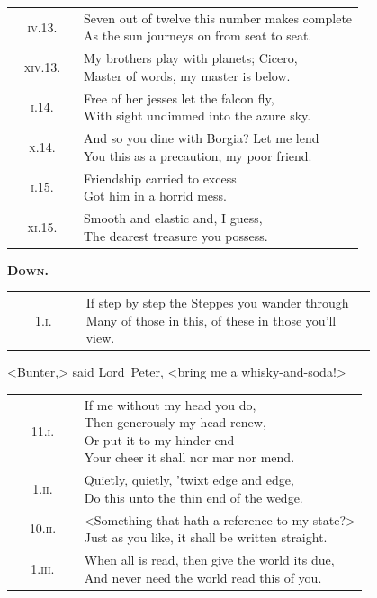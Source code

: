 \begin{longtable} {c p{0.8\linewidth}} 
\textsc{iv}.13. &  \makecell[l]{Seven out of twelve this number makes complete\\
As the sun journeys on from seat to seat.}\\
\textsc{xiv}.13. &  \makecell[l]{My brothers play with planets; Cicero,\\
Master of words, my master is below.}\\
\textsc{i}.14. &  \makecell[l]{Free of her jesses let the falcon fly,\\
With sight undimmed into the azure sky.}\\
\textsc{x}.14. &  \makecell[l]{And so you dine with Borgia? Let me lend\\
You this as a precaution, my poor friend.}\\
\textsc{i}.15. &  \makecell[l]{Friendship carried to excess\\
Got him in a horrid mess.}\\
\textsc{xi}.15. &  \makecell[l]{Smooth and elastic and, I guess,\\
The dearest treasure you possess.}\\
\end{longtable}

\pagebreak[2]

{\scshape\large\bfseries Down.}

\begin{longtable} {c p{0.8\linewidth}} 
1.\textsc{i.} &  \makecell[l]{If step by step the Steppes you wander through\\
Many of those in this, of these in those you'll view.}\\
\end{longtable}

<Bunter,> said Lord~Peter, <bring me a whisky-and-soda!>

\begin{longtable} {c p{0.8\linewidth}}
11.\textsc{i.} &  \makecell[l]{If me without my head you do,\\
Then generously my head renew,\\
Or put it to my hinder end—\\
Your cheer it shall nor mar nor mend.}\\
1.\textsc{ii.} &  \makecell[l]{Quietly, quietly, 'twixt edge and edge,\\
Do this unto the thin end of the wedge.}\\
10.\textsc{ii.} &  \makecell[l]{<Something that hath a reference to my state?>\\
Just as you like, it shall be written straight.}\\
1.\textsc{iii.} & \makecell[l]{ When all is read, then give the world its due,\\
And never need the world read this of you.}\\
\end{longtable}


